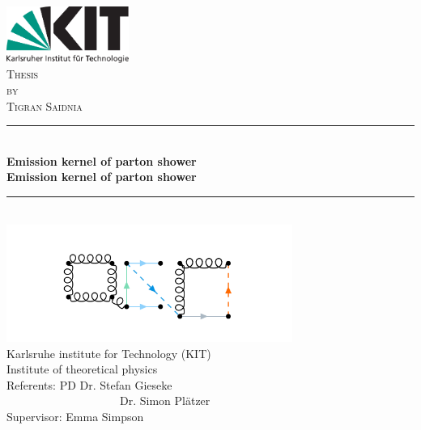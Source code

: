 \begin{titlepage}

\begin{center}


\includegraphics[width=0.3\textwidth]{images/kitlogo_de_rgb}\\[1cm]    

\textsc{\LARGE Thesis}\\[0.5cm]
\textsc{\Large by}\\[0.5cm]
\textsc{\Large Tigran Saidnia}\\[1.5cm]


\newcommand{\HRule}{\rule{\linewidth}{0.5mm}}
\HRule \\[0.8mm]
{\textbf{\Large \bfseries Emission kernel of parton shower}}\\[0.8mm]

{\textbf{\bfseries Emission kernel of parton shower}}\\[0.8mm]

\HRule \\[1cm]
\includegraphics[width=0.7\textwidth]{images/pp.PNG}\\[1cm]   
\Large Karlsruhe institute for Technology (KIT)\\[1.5mm]
\Large Institute of theoretical physics\\[1.5cm]
\Large Referents: PD Dr. Stefan Gieseke \\
\Large ~~~~~~~~~~~~~~~~~~~~Dr. Simon Plätzer\\

\Large Supervisor: Emma Simpson\\

\vfill


\end{center}

\end{titlepage}